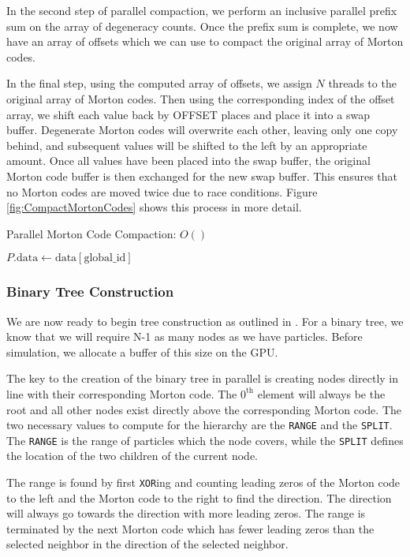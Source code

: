 \documentclass{thesis}
\begin{document}
In the second step of parallel compaction, we perform an inclusive parallel prefix sum on the array of degeneracy counts. Once the prefix sum is complete, we now have an array of offsets which we can use to compact the original array of Morton codes.

In the final step, using the computed array of offsets, we assign $N$ threads to the original array of Morton codes. Then using the corresponding index of the offset array, we shift each value back by OFFSET places and place it into a swap buffer. Degenerate Morton codes will overwrite each other, leaving only one copy behind, and subsequent values will be shifted to the left by an appropriate amount. Once all values have been placed into the swap buffer, the original Morton code buffer is then exchanged for the new swap buffer. This ensures that no Morton codes are moved twice due to race conditions. Figure \ref{fig:CompactMortonCodes} shows this process in more detail.
\begin{algorithm}
    \label{alg:ParallelCompaction}
    \caption{Parallel Morton Code Compaction: $O()$}
    \begin{algorithmic}
            $P.\text{data} \gets \text{data}[\text{global\_id}]$
        \EndFor
    \end{algorithmic}
\end{algorithm}
\subsubsection{Binary Tree Construction}
We are now ready to begin tree construction as outlined in \cite{Karras:2012}. For a binary tree, we know that we will require N-1 as many nodes as we have particles. Before simulation, we allocate a buffer of this size on the GPU.

The key to the creation of the binary tree in parallel is creating nodes directly in line with their corresponding  Morton code. The $\text{0}^\text{th}$ element will always be the root and all other nodes exist directly above the corresponding  Morton code. The two necessary values to compute for the hierarchy are the \texttt{RANGE} and the \texttt{SPLIT}. The \texttt{RANGE} is the range of particles which the node covers, while the \texttt{SPLIT} defines the location of the two children of the current node. 

The range is found by first \texttt{XOR}ing and counting leading zeros of the Morton code to the left and the Morton code to the right to find the direction. The direction will always go towards the direction with more leading zeros. The range is terminated by the next Morton code which has fewer leading zeros than the selected neighbor in the direction of the selected neighbor. 
\end{document}
